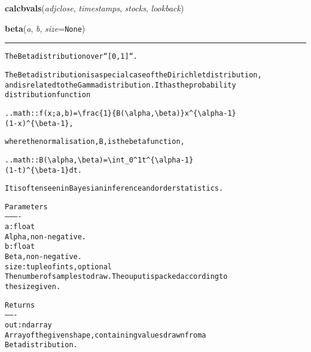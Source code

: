     \label{trunk:qstkutil:bollinger:calcbvals}

    \vspace{0.5ex}

\hspace{.8\funcindent}\begin{boxedminipage}{\funcwidth}

    \raggedright \textbf{calcbvals}(\textit{adjclose}, \textit{timestamps}, \textit{stocks}, \textit{lookback})

\setlength{\parskip}{2ex}
\setlength{\parskip}{1ex}
    \end{boxedminipage}

    \label{trunk:qstkutil:bollinger:beta}

    \vspace{0.5ex}

\hspace{.8\funcindent}\begin{boxedminipage}{\funcwidth}

    \raggedright \textbf{beta}(\textit{a}, \textit{b}, \textit{size}={\tt None})

    \vspace{-1.5ex}

    \rule{\textwidth}{0.5\fboxrule}
\setlength{\parskip}{2ex}
\begin{alltt}
The Beta distribution over ``[0, 1]``.

The Beta distribution is a special case of the Dirichlet distribution,
and is related to the Gamma distribution.  It has the probability
distribution function

.. math:: f(x; a,b) = {\textbackslash}frac\{1\}\{B({\textbackslash}alpha, {\textbackslash}beta)\} x{\textasciicircum}\{{\textbackslash}alpha - 1\}
                                                 (1 - x){\textasciicircum}\{{\textbackslash}beta - 1\},

where the normalisation, B, is the beta function,

.. math:: B({\textbackslash}alpha, {\textbackslash}beta) = {\textbackslash}int\_0{\textasciicircum}1 t{\textasciicircum}\{{\textbackslash}alpha - 1\}
                             (1 - t){\textasciicircum}\{{\textbackslash}beta - 1\} dt.

It is often seen in Bayesian inference and order statistics.

Parameters
----------
a : float
    Alpha, non-negative.
b : float
    Beta, non-negative.
size : tuple of ints, optional
    The number of samples to draw.  The ouput is packed according to
    the size given.

Returns
-------
out : ndarray
    Array of the given shape, containing values drawn from a
    Beta distribution.
\end{alltt}

\setlength{\parskip}{1ex}
    \end{boxedminipage}

